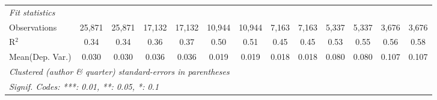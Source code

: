 \begin{tabular}{lcccccccccccc}
   \midrule
   \emph{Fit statistics}\\
   Observations                             & 25,871        & 25,871         & 17,132        & 17,132         & 10,944  & 10,944        & 7,163   & 7,163         & 5,337         & 5,337          & 3,676         & 3,676\\  
   R$^2$                                    & 0.34          & 0.34           & 0.36          & 0.37           & 0.50    & 0.51          & 0.45    & 0.45          & 0.53          & 0.55           & 0.56          & 0.58\\  
Mean(Dep. Var.) & 0.030 & 0.030 & 0.036 & 0.036 & 0.019 & 0.019 & 0.018 & 0.018 & 0.080 & 0.080 & 0.107 & 0.107 \\
   \midrule \midrule
   \multicolumn{13}{l}{\emph{Clustered (author \& quarter) standard-errors in parentheses}}\\
   \multicolumn{13}{l}{\emph{Signif. Codes: ***: 0.01, **: 0.05, *: 0.1}}\\
\end{tabular}
\par\endgroup
